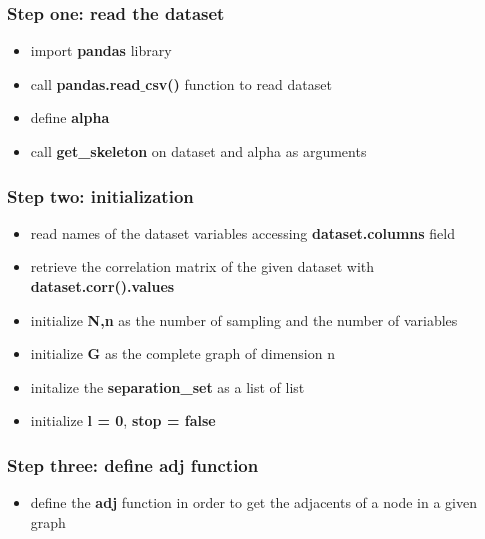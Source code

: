 \documentclass[xcolor ={table,usenames,dvipsnames}]{beamer}
\theoremstyle{definition}
\begin{document}
	\begin{frame}
		\frametitle{Step one: read the dataset}
		\begin{itemize}
			\item import \textbf{pandas} library
			\item call \textbf{pandas.read$\_$csv()} function to read dataset
			\item define \textbf{alpha}
			\item call \textbf{get\_skeleton} on dataset and alpha as arguments
		\end{itemize}
		
	\end{frame}
	\begin{frame}
\frametitle{Step two: initialization}
\begin{itemize}
	\item read names of the dataset variables accessing \textbf{dataset.columns} field
	\item retrieve the correlation matrix of the given dataset with \textbf{dataset.corr().values}
	\item initialize \textbf{N,n} as the number of sampling and the number of variables
	\item initialize \textbf{G} as the complete graph of dimension n
	\item initalize the \textbf{separation\_set} as a list of list
	\item initialize \textbf{l = 0}, \textbf{stop = false}
\end{itemize}

\end{frame}
\begin{frame}
\frametitle{Step three: define adj function}
\begin{itemize}
	\item define the \textbf{adj} function in order to get the adjacents of a node in a given graph
\end{itemize}

\end{frame}
\end{document}
